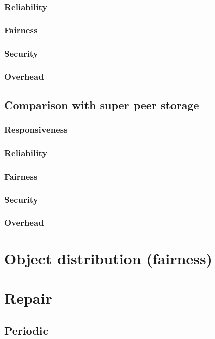                 \subsubsection{Reliability}
                \subsubsection{Fairness}
                \subsubsection{Security}
                \subsubsection{Overhead}
            \subsection{Comparison with super peer storage}
                \subsubsection{Responsiveness}
                \subsubsection{Reliability}
                \subsubsection{Fairness}
                \subsubsection{Security}
                \subsubsection{Overhead}

\section{Object distribution (fairness)}

    \section{Repair}
    \label{reliability_compare_retrieval}
            \subsection{Periodic}
